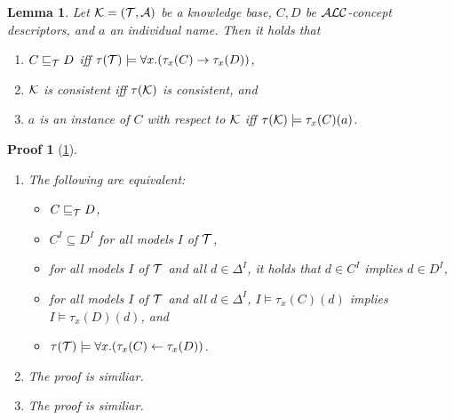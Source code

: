 \documentclass[openany]{scrbook}
\theoremstyle{break}
\newtheorem{Lemma}[Theorem]{Lemma}
\theoremstyle{nonumberbreak}
\theoremstyle{nonumberplain}
\theoremstyle{nonumberbreak}
\newtheorem{Proof}{Proof}
\newcommand{\ot}{\leftarrow}
\newcommand{\ALC}{{\cal A}{\cal L}{\cal C}}
\begin{document}
\begin{Lemma}
  \label{2.19}
  Let ${\cal K} = ({\cal T}, {\cal A})$ be a knowledge base, $C, D$ be
  $\ALC$-concept descriptors, and $a$ an individual name. Then it
  holds that
  \begin{enumerate}
  \item $C \sqsubseteq_{\cal T} D$ iff $\tau({\cal T}) \models \forall
    x.(\tau_x(C) \to \tau_x(D))$,
  \item ${\cal K}$ is consistent iff $\tau({\cal K})$ is consistent, and
  \item $a$ is an instance of $C$ with respect to ${\cal K}$ iff
    $\tau({\cal K}) \models \tau_x(C)(a)$.
  \end{enumerate}
\end{Lemma}

\begin{Proof}[\cref{2.19}]
  \begin{enumerate}
  \item The following are equivalent:
    \begin{itemize}
    \item $C \sqsubseteq_{\cal T} D$,
    \item $C^I \subseteq D^I$ for all models $I$ of ${\cal T}$,
    \item for all models $I$ of ${\cal T}$ and all $d \in \Delta^I$,
      it holds that $d \in C^I$ implies $d \in D^I$,
    \item for all models $I$ of ${\cal T}$ and all $d \in \Delta^I$,
      $I \models \tau_x(C)(d)$ implies $I \models \tau_x(D)(d)$, and
    \item $\tau({\cal T}) \models \forall x.(\tau_x(C) \ot
      \tau_x(D))$.
    \end{itemize}
  \item The proof is similiar.
  \item The proof is similiar.
  \end{enumerate}
\end{Proof}
\end{document}
